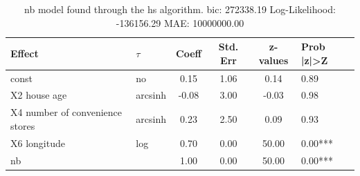 \begin{table}
	\caption{nb model found through the hs algorithm. bic: 272338.19 Log-Likelihood: -136156.29 MAE: 10000000.00}
	\begin{center}
		\begin{tabular}{|l|l|c|c|c|l|}
			\hline
			Effect & $\tau$ & Coeff & Std. Err & z-values & Prob |z|>Z \\
			\hline
			const & no & 0.15 & 1.06 & 0.14 & 0.89 \\
			\hline
			X2 house age & arcsinh & -0.08 & 3.00 & -0.03 & 0.98 \\
			\hline
			X4 number of convenience stores & arcsinh & 0.23 & 2.50 & 0.09 & 0.93 \\
			\hline
			X6 longitude & log & 0.70 & 0.00 & 50.00 & 0.00*** \\
			\hline
			nb &  & 1.00 & 0.00 & 50.00 & 0.00*** \\
			\hline
		\end{tabular}
	\end{center}
\end{table}